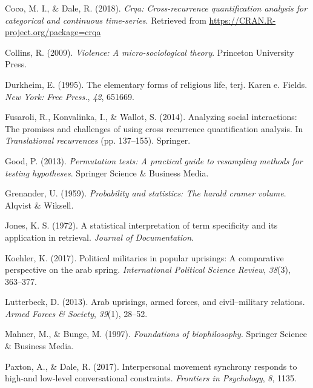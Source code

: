 \documentclass[english,man]{apa6}
\begin{document}
\leavevmode\hypertarget{ref-R-crqa}{}%
Coco, M. I., \& Dale, R. (2018). \emph{Crqa: Cross-recurrence quantification analysis for categorical and continuous time-series}. Retrieved from \url{https://CRAN.R-project.org/package=crqa}

\leavevmode\hypertarget{ref-collins2009violence}{}%
Collins, R. (2009). \emph{Violence: A micro-sociological theory}. Princeton University Press.

\leavevmode\hypertarget{ref-durkheim1995elementary}{}%
Durkheim, E. (1995). The elementary forms of religious life, terj. Karen e. Fields. \emph{New York: Free Press.}, \emph{42}, 651669.

\leavevmode\hypertarget{ref-fusaroli2014analyzing}{}%
Fusaroli, R., Konvalinka, I., \& Wallot, S. (2014). Analyzing social interactions: The promises and challenges of using cross recurrence quantification analysis. In \emph{Translational recurrences} (pp. 137--155). Springer.

\leavevmode\hypertarget{ref-good2013permutation}{}%
Good, P. (2013). \emph{Permutation tests: A practical guide to resampling methods for testing hypotheses}. Springer Science \& Business Media.

\leavevmode\hypertarget{ref-grenander1959probability}{}%
Grenander, U. (1959). \emph{Probability and statistics: The harald cramer volume}. Alqvist \& Wiksell.

\leavevmode\hypertarget{ref-jones1972statistical}{}%
Jones, K. S. (1972). A statistical interpretation of term specificity and its application in retrieval. \emph{Journal of Documentation}.

\leavevmode\hypertarget{ref-koehler2017political}{}%
Koehler, K. (2017). Political militaries in popular uprisings: A comparative perspective on the arab spring. \emph{International Political Science Review}, \emph{38}(3), 363--377.

\leavevmode\hypertarget{ref-lutterbeck2013arab}{}%
Lutterbeck, D. (2013). Arab uprisings, armed forces, and civil--military relations. \emph{Armed Forces \& Society}, \emph{39}(1), 28--52.

\leavevmode\hypertarget{ref-mahner1997foundations}{}%
Mahner, M., \& Bunge, M. (1997). \emph{Foundations of biophilosophy}. Springer Science \& Business Media.

\leavevmode\hypertarget{ref-paxton2017interpersonal}{}%
Paxton, A., \& Dale, R. (2017). Interpersonal movement synchrony responds to high-and low-level conversational constraints. \emph{Frontiers in Psychology}, \emph{8}, 1135.
\end{document}
